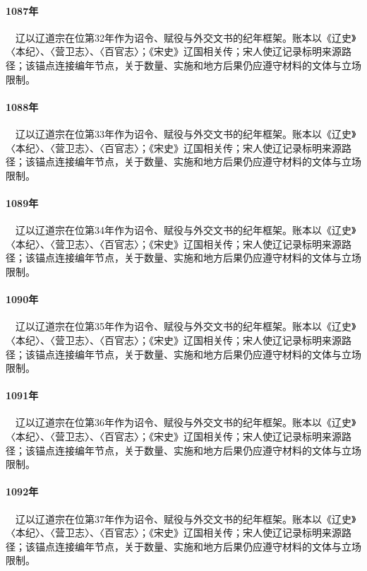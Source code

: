 \paragraph{1087年}　辽以辽道宗在位第32年作为诏令、赋役与外交文书的纪年框架。账本以《辽史》〈本纪〉、〈营卫志〉、〈百官志〉；《宋史》辽国相关传；宋人使辽记录标明来源路径；该锚点连接编年节点，关于数量、实施和地方后果仍应遵守材料的文体与立场限制。

\paragraph{1088年}　辽以辽道宗在位第33年作为诏令、赋役与外交文书的纪年框架。账本以《辽史》〈本纪〉、〈营卫志〉、〈百官志〉；《宋史》辽国相关传；宋人使辽记录标明来源路径；该锚点连接编年节点，关于数量、实施和地方后果仍应遵守材料的文体与立场限制。

\paragraph{1089年}　辽以辽道宗在位第34年作为诏令、赋役与外交文书的纪年框架。账本以《辽史》〈本纪〉、〈营卫志〉、〈百官志〉；《宋史》辽国相关传；宋人使辽记录标明来源路径；该锚点连接编年节点，关于数量、实施和地方后果仍应遵守材料的文体与立场限制。

\paragraph{1090年}　辽以辽道宗在位第35年作为诏令、赋役与外交文书的纪年框架。账本以《辽史》〈本纪〉、〈营卫志〉、〈百官志〉；《宋史》辽国相关传；宋人使辽记录标明来源路径；该锚点连接编年节点，关于数量、实施和地方后果仍应遵守材料的文体与立场限制。

\paragraph{1091年}　辽以辽道宗在位第36年作为诏令、赋役与外交文书的纪年框架。账本以《辽史》〈本纪〉、〈营卫志〉、〈百官志〉；《宋史》辽国相关传；宋人使辽记录标明来源路径；该锚点连接编年节点，关于数量、实施和地方后果仍应遵守材料的文体与立场限制。

\paragraph{1092年}　辽以辽道宗在位第37年作为诏令、赋役与外交文书的纪年框架。账本以《辽史》〈本纪〉、〈营卫志〉、〈百官志〉；《宋史》辽国相关传；宋人使辽记录标明来源路径；该锚点连接编年节点，关于数量、实施和地方后果仍应遵守材料的文体与立场限制。

